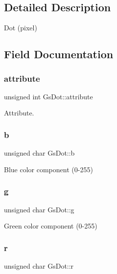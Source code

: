 \subsection{Detailed Description}
Dot (pixel) 

\subsection{Field Documentation}
\mbox{\label{structGsDot_ae4d3c753ac176af37039500837a9a003}} 
\subsubsection{\texorpdfstring{attribute}{attribute}}
{\footnotesize\ttfamily unsigned int Gs\+Dot\+::attribute}



Attribute. 

\mbox{\label{structGsDot_ad0f6124b5faafdd9a5870f4c30d454d8}} 
\subsubsection{\texorpdfstring{b}{b}}
{\footnotesize\ttfamily unsigned char Gs\+Dot\+::b}



Blue color component (0-\/255) 

\mbox{\label{structGsDot_adf5853b35a2beaae08ae0470b946475e}} 
\subsubsection{\texorpdfstring{g}{g}}
{\footnotesize\ttfamily unsigned char Gs\+Dot\+::g}



Green color component (0-\/255) 

\mbox{\label{structGsDot_a319bcb88e61d9c53c2955741cd606664}} 
\subsubsection{\texorpdfstring{r}{r}}
{\footnotesize\ttfamily unsigned char Gs\+Dot\+::r}



